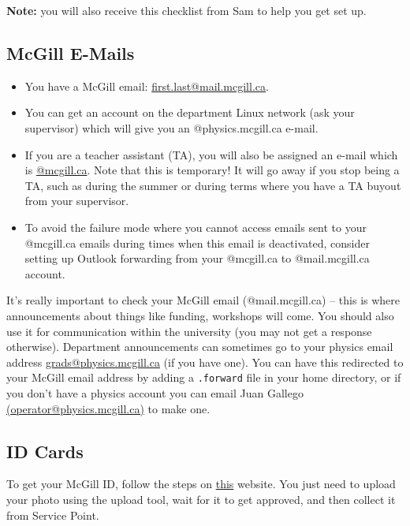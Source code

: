 \medskip

\textbf{\color{ocre}Note:} you will also receive this checklist from Sam to help you get set up.

\subsection*{McGill E-Mails}
\begin{itemize}
    \item You have a McGill email: 
    \href{mailto:first.last@mail.mcgill.ca}{first.last@mail.mcgill.ca}.

    \item You can get an account on the department Linux network (ask your supervisor) which will give you an @physics.mcgill.ca e-mail.

    \item If you are a teacher assistant (TA), you will also be assigned an e-mail which is 
    \href{mailto:@mcgill.ca}{@mcgill.ca}. Note that this is temporary! It will go away if you stop being a TA, such as during the summer or during terms where you have a TA buyout from your supervisor. 
    \item To avoid the failure mode where you cannot access emails sent to your @mcgill.ca emails during times when this email is deactivated, consider setting up Outlook forwarding from your @mcgill.ca to @mail.mcgill.ca account.
\end{itemize}

It’s really important to check your McGill email (@mail.mcgill.ca) -- this is where announcements about things like funding, workshops will come. You should also use it for communication within the university (you may not get a response otherwise). Department announcements can sometimes go to your physics email address \href{mailto:grads@physics.mcgill.ca}{grads@physics.mcgill.ca} (if you have one). You can have this redirected to your McGill email address by adding a \texttt{.forward} file in your home directory, or if you don’t have a physics account you can email Juan Gallego \href{mailto:operator@physics.mcgill.ca}{(operator@physics.mcgill.ca)} to make one.

\subsection*{ID Cards}
To get your McGill ID, follow the steps on \href{https://www.mcgill.ca/student-records/personal-information/id}{this} website. You just need to upload your photo using the upload tool, wait for it to get approved, and then collect it from Service Point.

